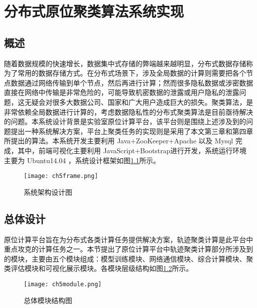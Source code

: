 \chapter{分布式原位聚类算法系统实现}

\section{概述}
随着数据规模的快速增长，数据集中式存储的弊端越来越明显，分布式数据存储称为了常用的数据存储方式。在分布式场景下，涉及全局数据的计算则需要把各个节点数据通过网络传输到单个节点，然后再进行计算；然而很多隐私数据或涉密数据直接在网络中传输是非常危险的，可能导致机密数据的泄露或用户隐私的泄露问题，这无疑会对很多大数据公司、国家和广大用户造成巨大的损失。聚类算法，是非常依赖全局数据进行计算的，考虑数据隐私性的分布式聚类算法是目前亟待解决的问题。本系统设计背景是实验室原位计算平台，该平台则是围绕上述涉及到的问题提出一种系统解决方案，平台上聚类任务的实现则是采用了本文第三章和第四章所提出的算法。本系统开发主要利用 Java+ZooKeeper+Apache 以及 Mysql 完成，其中，前端可视化主要利用 JavaScript+Bootstrap进行开发，系统运行环境主要为 Ubuntu14.04 ，系统设计框架如图\ref{ch5frame}所示。
\begin{figure}[H]
	\texttt{[image: ch5frame.png]}
	\caption{系统架构设计图}
	\label{ch5frame}
\end{figure}

\section{总体设计}
原位计算平台旨在为分布式各类计算任务提供解决方案，轨迹聚类计算是此平台中重点攻克的计算任务之一。本节提出了原位计算平台中轨迹聚类计算部分所涉及到的模块，主要由五个模块组成：模型训练模块、网络通信模块、综合计算模块、聚类评估模块和可视化展示模块。各模块层级结构如图\ref{ch5module}所示。
\begin{figure}[H]
	\texttt{[image: ch5module.png]}
	\caption{总体模块结构图}
	\label{ch5module}
\end{figure}

